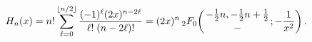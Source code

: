 \[\mathop{H_{n}\/}\nolimits\!\left(x\right)=n!\sum_{\ell=0}^{\left\lfloor n/2%
\right\rfloor}\frac{(-1)^{\ell}(2x)^{n-2\ell}}{\ell!\;(n-2\ell)!}=(2x)^{n}%
\mathop{{{}_{2}F_{0}}\/}\nolimits\!\left({-\tfrac{1}{2}n,-\tfrac{1}{2}n+\tfrac%
{1}{2}\atop-};-\frac{1}{x^{2}}\right).\]